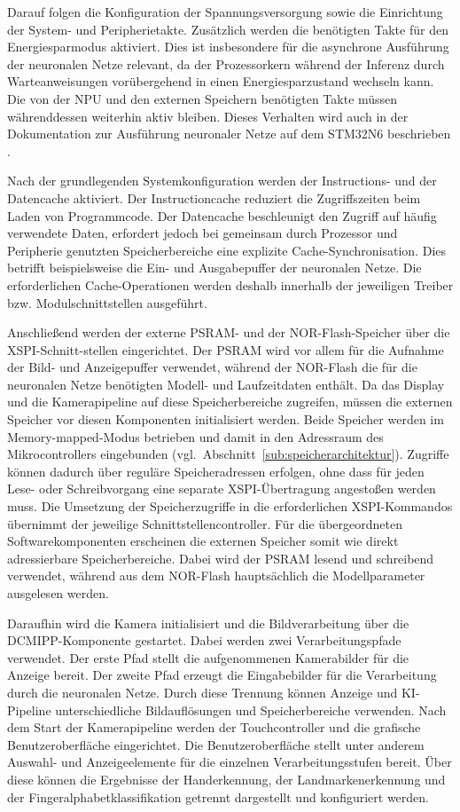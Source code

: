 Darauf folgen die Konfiguration der Spannungsversorgung sowie die Einrichtung der System- und Peripherietakte. Zusätzlich werden die benötigten Takte für den Energiesparmodus aktiviert. Dies ist insbesondere für die asynchrone Ausführung der neuronalen Netze relevant, da der Prozessorkern während der Inferenz durch Warteanweisungen vorübergehend in einen Energiesparzustand wechseln kann. Die von der NPU und den externen Speichern benötigten Takte müssen währenddessen weiterhin aktiv bleiben. Dieses Verhalten wird auch in der Dokumentation zur Ausführung neuronaler Netze auf dem STM32N6 beschrieben \cite{STM32N6ExampleProjects}.

Nach der grundlegenden Systemkonfiguration werden der Instructions- und der Datencache aktiviert. Der Instructioncache reduziert die Zugriffszeiten beim Laden von Programmcode. Der Datencache beschleunigt den Zugriff auf häufig verwendete Daten, erfordert jedoch bei gemeinsam durch Prozessor und Peripherie genutzten Speicherbereiche eine explizite Cache-Synchronisation. Dies betrifft beispielsweise die Ein- und Ausgabepuffer der neuronalen Netze. Die erforderlichen Cache-Operationen werden deshalb innerhalb der jeweiligen Treiber bzw. Modulschnittstellen ausgeführt.

Anschließend werden der externe PSRAM- und der NOR-Flash-Speicher über die XSPI-Schnitt-stellen eingerichtet. Der PSRAM wird vor allem für die Aufnahme der Bild- und Anzeigepuffer verwendet, während der NOR-Flash die für die neuronalen Netze benötigten Modell- und Laufzeitdaten enthält. Da das Display und die Kamerapipeline auf diese Speicherbereiche zugreifen, müssen die externen Speicher vor diesen Komponenten initialisiert werden. Beide Speicher werden im Memory-mapped-Modus betrieben und damit in den Adressraum des Mikrocontrollers eingebunden (vgl.\ Abschnitt~\ref{sub:speicherarchitektur}). Zugriffe können dadurch über reguläre Speicheradressen erfolgen, ohne dass für jeden Lese- oder Schreibvorgang eine separate XSPI-Übertragung angestoßen werden muss. Die Umsetzung der Speicherzugriffe in die erforderlichen XSPI-Kommandos übernimmt der jeweilige Schnittstellencontroller. Für die übergeordneten Softwarekomponenten erscheinen die externen Speicher somit wie direkt adressierbare Speicherbereiche. Dabei wird der PSRAM lesend und schreibend verwendet, während aus dem NOR-Flash hauptsächlich die Modellparameter ausgelesen werden.

Daraufhin wird die Kamera initialisiert und die Bildverarbeitung über die DCMIPP-Komponente gestartet. Dabei werden zwei Verarbeitungspfade verwendet. Der erste Pfad stellt die aufgenommenen Kamerabilder für die Anzeige bereit. Der zweite Pfad erzeugt die Eingabebilder für die Verarbeitung durch die neuronalen Netze. Durch diese Trennung können Anzeige und KI-Pipeline unterschiedliche Bildauflösungen und Speicherbereiche verwenden. Nach dem Start der Kamerapipeline werden der Touchcontroller und die grafische Benutzeroberfläche eingerichtet. Die Benutzeroberfläche stellt unter anderem Auswahl- und Anzeigeelemente für die einzelnen Verarbeitungsstufen bereit. Über diese können die Ergebnisse der Handerkennung, der Landmarkenerkennung und der Fingeralphabetklassifikation getrennt dargestellt und konfiguriert werden.

